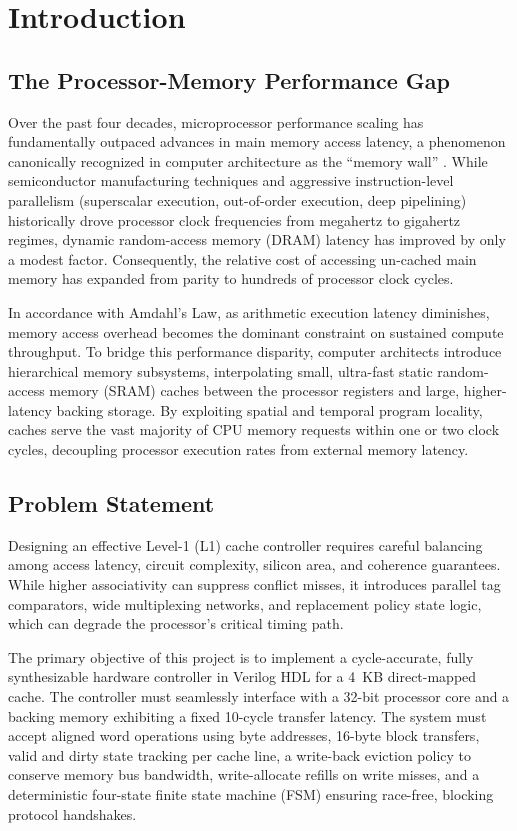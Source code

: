 \documentclass[conference]{IEEEtran}
\begin{document}
\section{Introduction}
\subsection{The Processor-Memory Performance Gap}
Over the past four decades, microprocessor performance scaling has fundamentally outpaced advances in main memory access latency, a phenomenon canonically recognized in computer architecture as the ``memory wall'' \cite{hennessy2019computer, patterson2020computer}. While semiconductor manufacturing techniques and aggressive instruction-level parallelism (superscalar execution, out-of-order execution, deep pipelining) historically drove processor clock frequencies from megahertz to gigahertz regimes, dynamic random-access memory (DRAM) latency has improved by only a modest factor. Consequently, the relative cost of accessing un-cached main memory has expanded from parity to hundreds of processor clock cycles.

In accordance with Amdahl's Law, as arithmetic execution latency diminishes, memory access overhead becomes the dominant constraint on sustained compute throughput. To bridge this performance disparity, computer architects introduce hierarchical memory subsystems, interpolating small, ultra-fast static random-access memory (SRAM) caches between the processor registers and large, higher-latency backing storage. By exploiting spatial and temporal program locality, caches serve the vast majority of CPU memory requests within one or two clock cycles, decoupling processor execution rates from external memory latency.

\subsection{Problem Statement}
Designing an effective Level-1 (L1) cache controller requires careful balancing among access latency, circuit complexity, silicon area, and coherence guarantees. While higher associativity can suppress conflict misses, it introduces parallel tag comparators, wide multiplexing networks, and replacement policy state logic, which can degrade the processor's critical timing path.

The primary objective of this project is to implement a cycle-accurate, fully synthesizable hardware controller in Verilog HDL for a 4~KB direct-mapped cache. The controller must seamlessly interface with a 32-bit processor core and a backing memory exhibiting a fixed 10-cycle transfer latency. The system must accept aligned word operations using byte addresses, 16-byte block transfers, valid and dirty state tracking per cache line, a write-back eviction policy to conserve memory bus bandwidth, write-allocate refills on write misses, and a deterministic four-state finite state machine (FSM) ensuring race-free, blocking protocol handshakes.
\end{document}
